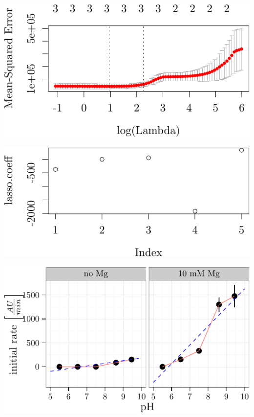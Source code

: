 \documentclass[]{tufte-handout}
\begin{document}
\begin{marginfigure}
 \includegraphics{analysis_tufte_files/figure-latex/unnamed-chunk-9-1.pdf}
\end{marginfigure}\begin{marginfigure}
 \includegraphics{analysis_tufte_files/figure-latex/unnamed-chunk-9-2.pdf}
\end{marginfigure}\begin{marginfigure}
 \includegraphics{analysis_tufte_files/figure-latex/unnamed-chunk-9-3.pdf}
\end{marginfigure}
\end{document}
